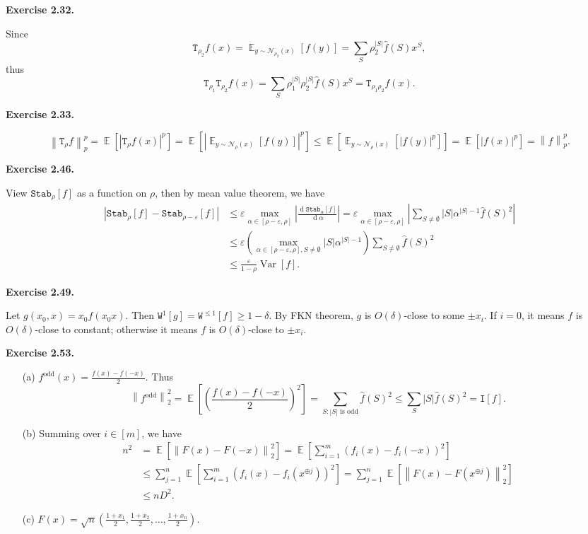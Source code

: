 \documentclass[a4paper]{article}
\newenvironment{exercise}[1]{
	\par
	\noindent\textbf{Exercise #1.}\quad
}{
	\par
	\bigskip
}
\DeclareMathOperator{\E}{\mathbb E}
\DeclareMathOperator{\Var}{\mathrm{Var}}
\DeclareMathOperator{\sd}{\mathop{d}}
\newcommand{\eps}{\varepsilon}
\newcommand{\abs}[1]{{\left| #1 \right|}}
\newcommand{\vabs}[1]{{\left\| #1 \right\|}}
\newcommand{\pbra}[1]{{\left( #1 \right)}}
\newcommand{\sbra}[1]{{\left[ #1 \right]}}
\newcommand{\Ncal}{\mathcal{N}}
\newcommand{\Itt}{\mathtt{I}}
\newcommand{\Wtt}{\mathtt{W}}
\newcommand{\Ttt}{\mathtt{T}}
\newcommand{\Stab}{\mathtt{Stab}}
\begin{document}
\begin{exercise}{2.32}
    Since
    $$
    \Ttt_{\rho_2} f(x)=\E_{y\sim\Ncal_{\rho_2}(x)}[f(y)]=\sum_S\rho_2^{|S|}\hat f(S)x^S,
    $$
    thus
    $$
    \Ttt_{\rho_1}\Ttt_{\rho_2} f(x)=\sum_S\rho_1^{|S|}\rho_2^{|S|}\hat f(S)x^S=\Ttt_{\rho_1\rho_2} f(x).
    $$
\end{exercise}

\begin{exercise}{2.33}
    $$
    \vabs{\Ttt_\rho f}^p_p
    =\E\sbra{\abs{\Ttt_\rho f(x)}^p}
    =\E\sbra{\abs{\E_{y\sim\Ncal_\rho(x)}\sbra{f(y)}}^p}
    \leq\E\sbra{\E_{y\sim\Ncal_\rho(x)}\sbra{\abs{f(y)}^p}}
    =\E\sbra{\abs{f(x)}^p}
    =\vabs{f}^p_p.
    $$
\end{exercise}

\begin{exercise}{2.46}
    View $\Stab_\rho[f]$ as a function on $\rho$, then by mean value theorem, we have
    \begin{align*}
    \abs{\Stab_\rho[f]-\Stab_{\rho-\eps}[f]}
        &\leq\eps\max_{\alpha\in[\rho-\eps,\rho]}\abs{\frac{\sd\Stab_\alpha[f]}{\sd\alpha}}
        =\eps\max_{\alpha\in[\rho-\eps,\rho]}\abs{\sum_{S\neq\emptyset}|S|\alpha^{|S|-1}\hat f(S)^2}\\
        &\leq\eps\pbra{\max_{\alpha\in[\rho-\eps,\rho],S\neq\emptyset}|S|\alpha^{|S|-1}}\sum_{S\neq\emptyset}\hat f(S)^2\\
        &\leq\frac\eps{1-\rho}\Var[f].
    \end{align*}
\end{exercise}

\begin{exercise}{2.49}
    Let $g(x_0,x)=x_0f(x_0x)$. Then $\Wtt^1[g]=\Wtt^{\leq1}[f]\geq1-\delta$. By FKN theorem, $g$ is $O(\delta)$-close to some $\pm x_i$. If $i=0$, it means $f$ is $O(\delta)$-close to constant; otherwise it means $f$ is $O(\delta)$-close to $\pm x_i$.
\end{exercise}

\begin{exercise}{2.53}
    \begin{itemize}
        \item[(a)] $f^{\text{odd}}(x)=\frac{f(x)-f(-x)}2$. Thus
            $$
            \vabs{f^\text{odd}}_2^2=\E\sbra{\pbra{\frac{f(x)-f(-x)}2}^2}=\sum_{S:|S|\text{ is odd}}\hat f(S)^2
            \leq\sum_S|S|\hat f(S)^2=\Itt[f].
            $$
        \item[(b)] Summing over $i\in[m]$, we have
            \begin{align*}
            n^2&=\E\sbra{\vabs{F(x)-F(-x)}_2^2}=\E\sbra{\sum_{i=1}^m\pbra{f_i(x)-f_i(-x)}^2}\\
            &\leq\sum_{j=1}^n\E\sbra{\sum_{i=1}^m\pbra{f_i(x)-f_i(x^{\oplus j})}^2}=\sum_{j=1}^n\E\sbra{\vabs{F(x)-F(x^{\oplus j})}_2^2}\\
            &\leq nD^2.
            \end{align*}
        \item[(c)] $F(x)=\sqrt n\pbra{\frac{1+x_1}2,\frac{1+x_2}2,\ldots,\frac{1+x_n}2}$.
    \end{itemize}
\end{exercise}
\end{document}
